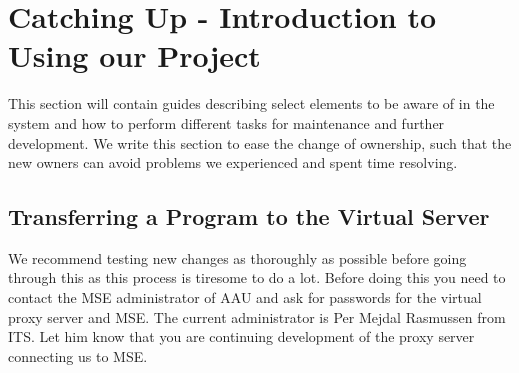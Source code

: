 \section{Catching Up - Introduction to Using our Project}\label{sec:catchup}
This section will contain guides describing select elements to be aware of in the system and how to perform different tasks for maintenance and further development. We write this section to ease the change of ownership, such that the new owners can avoid problems we experienced and spent time resolving. 

\subsection*{Transferring a Program to the Virtual Server}
We recommend testing new changes as thoroughly as possible before going through this as this process is tiresome to do a lot. Before doing this you need to contact the MSE administrator of AAU and ask for passwords for the virtual proxy server and MSE. The current administrator is Per Mejdal Rasmussen from ITS. Let him know that you are continuing development of the proxy server connecting us to MSE.

